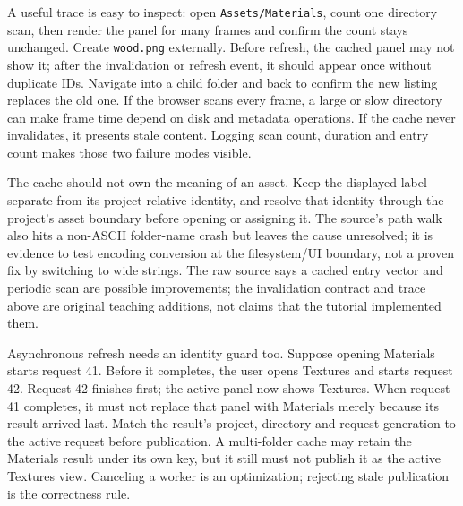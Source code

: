 A useful trace is easy to inspect: open \texttt{Assets/Materials}, count one directory scan, then render the panel for many frames and confirm the count stays unchanged. Create \texttt{wood.png} externally. Before refresh, the cached panel may not show it; after the invalidation or refresh event, it should appear once without duplicate IDs. Navigate into a child folder and back to confirm the new listing replaces the old one. If the browser scans every frame, a large or slow directory can make frame time depend on disk and metadata operations. If the cache never invalidates, it presents stale content. Logging scan count, duration and entry count makes those two failure modes visible.

The cache should not own the meaning of an asset. Keep the displayed label separate from its project-relative identity, and resolve that identity through the project's asset boundary before opening or assigning it. The source's path walk also hits a non-ASCII folder-name crash but leaves the cause unresolved; it is evidence to test encoding conversion at the filesystem/UI boundary, not a proven fix by switching to wide strings. The raw source says a cached entry vector and periodic scan are possible improvements; the invalidation contract and trace above are original teaching additions, not claims that the tutorial implemented them.

Asynchronous refresh needs an identity guard too. Suppose opening Materials starts request 41. Before it completes, the user opens Textures and starts request 42. Request 42 finishes first; the active panel now shows Textures. When request 41 completes, it must not replace that panel with Materials merely because its result arrived last. Match the result's project, directory and request generation to the active request before publication. A multi-folder cache may retain the Materials result under its own key, but it still must not publish it as the active Textures view. Canceling a worker is an optimization; rejecting stale publication is the correctness rule.

